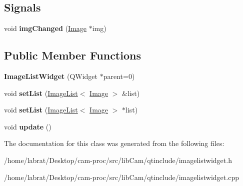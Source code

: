 \subsection*{Signals}
\begin{DoxyCompactItemize}
\item 
void {\bfseries img\+Changed} (\hyperlink{classImage}{Image} $\ast$img)\hypertarget{classImageListWidget_a2b1d6b5fb213f1f6dae7e34b979cde80}{}\label{classImageListWidget_a2b1d6b5fb213f1f6dae7e34b979cde80}

\end{DoxyCompactItemize}
\subsection*{Public Member Functions}
\begin{DoxyCompactItemize}
\item 
{\bfseries Image\+List\+Widget} (Q\+Widget $\ast$parent=0)\hypertarget{classImageListWidget_a1341f99cb74bce49ff7c88a276d8b47a}{}\label{classImageListWidget_a1341f99cb74bce49ff7c88a276d8b47a}

\item 
void {\bfseries set\+List} (\hyperlink{classImageList}{Image\+List}$<$ \hyperlink{classImage}{Image} $>$ \&list)\hypertarget{classImageListWidget_a082180b9fbd451361213cb7a58e54cb7}{}\label{classImageListWidget_a082180b9fbd451361213cb7a58e54cb7}

\item 
void {\bfseries set\+List} (\hyperlink{classImageList}{Image\+List}$<$ \hyperlink{classImage}{Image} $>$ $\ast$list)\hypertarget{classImageListWidget_a43a6fbb5237469ae5ee0e2c87cec9219}{}\label{classImageListWidget_a43a6fbb5237469ae5ee0e2c87cec9219}

\item 
void {\bfseries update} ()\hypertarget{classImageListWidget_acf3a054202f9e3ec174b3ce49bc4d18c}{}\label{classImageListWidget_acf3a054202f9e3ec174b3ce49bc4d18c}

\end{DoxyCompactItemize}


The documentation for this class was generated from the following files\+:\begin{DoxyCompactItemize}
\item 
/home/labrat/\+Desktop/cam-\/proc/src/lib\+Cam/qtinclude/imagelistwidget.\+h\item 
/home/labrat/\+Desktop/cam-\/proc/src/lib\+Cam/qtinclude/imagelistwidget.\+cpp\end{DoxyCompactItemize}
